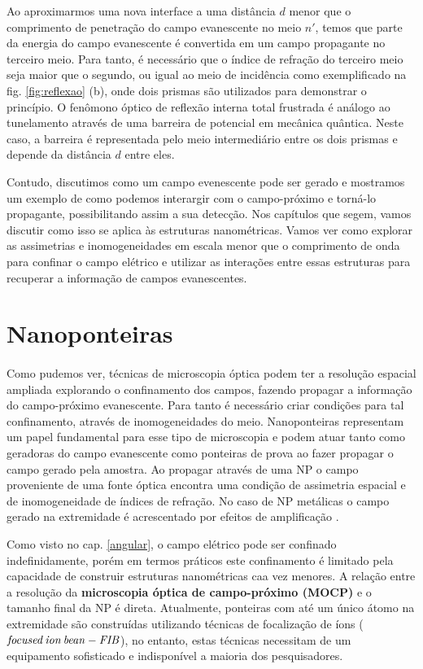 Ao aproximarmos uma nova interface a uma distância $d$ menor que o comprimento de penetração do campo evanescente no meio $n'$, temos que parte da energia do campo evanescente é convertida em um campo propagante no terceiro meio. Para tanto, é necessário que o índice de refração do terceiro meio seja maior que o segundo, ou igual ao meio de incidência como exemplificado na fig. \ref{fig:reflexao} (b), onde dois prismas são utilizados para demonstrar o princípio. O fenômono óptico de reflexão interna total frustrada é análogo ao tunelamento através de uma barreira de potencial em mecânica quântica. Neste caso, a barreira é representada pelo meio intermediário entre os dois prismas e depende da distância $d$ entre eles.

Contudo, discutimos como um campo evenescente pode ser gerado e mostramos um exemplo de como podemos interargir com o campo-próximo e torná-lo propagante, possibilitando assim a sua detecção. Nos capítulos que segem, vamos discutir como isso se aplica às estruturas nanométricas. Vamos ver como explorar as assimetrias e inomogeneidades em escala menor que o comprimento de onda para confinar o campo elétrico e utilizar as interações entre essas estruturas para recuperar a informação de campos evanescentes.

\section{Nanoponteiras}
\paragraph{}
Como pudemos ver, técnicas de microscopia óptica podem ter a resolução espacial ampliada explorando o confinamento dos campos, fazendo propagar a informação do campo-próximo evanescente. Para tanto é necessário criar condições para tal confinamento, através de inomogeneidades  do meio. Nanoponteiras representam um papel fundamental para esse tipo de microscopia e podem atuar tanto como geradoras do campo evanescente como ponteiras de prova ao fazer propagar o campo gerado pela amostra. Ao propagar através de uma NP o campo proveniente de uma fonte óptica encontra uma condição de assimetria espacial e de inomogeneidade de índices de refração. No caso de NP metálicas o campo gerado na extremidade é acrescentado por efeitos de amplificação \cite{bouhelier,picardi,nature}.

 Como visto no cap. \ref{angular}, o campo elétrico pode ser confinado indefinidamente, porém em termos práticos este confinamento é limitado pela capacidade de construir estruturas nanométricas caa vez menores. A relação entre a resolução da \textbf{microscopia óptica de campo-próximo (MOCP)} e o tamanho final da NP é direta. Atualmente, ponteiras com até um único átomo na extremidade são construídas utilizando técnicas de focalização de íons ($\it{focused\, ion\, bean - FIB}$), no entanto, estas técnicas necessitam de um equipamento sofisticado e indisponível a maioria dos pesquisadores.

